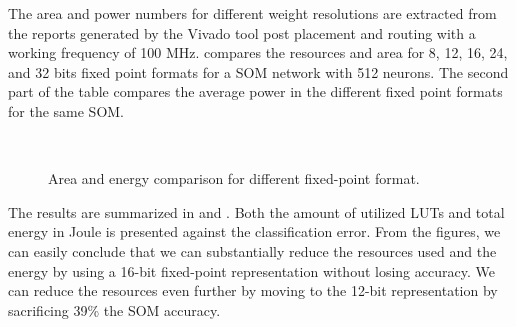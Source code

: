 The area and power numbers for different weight resolutions are extracted from the reports generated by the Vivado tool post placement and routing with a working frequency of 100 MHz.
 compares the resources and area for 8, 12, 16, 24, and 32 bits fixed point formats for a SOM network with 512 neurons. The second part of the table compares the average power in the different fixed point formats for the same SOM.

\begin{figure}[htb]
	\centering
	~
	\caption{ Area and energy comparison for different fixed-point format.}
	\label{fig:metrics}
\end{figure}
The results are summarized in  and . Both the amount of utilized LUTs and total energy in Joule is presented against the classification error. From the figures, we can easily conclude that we can substantially reduce the resources used and the energy by using a 16-bit fixed-point representation without losing accuracy. We can reduce the resources even further by moving to the 12-bit representation by sacrificing 39\% the SOM accuracy. 
